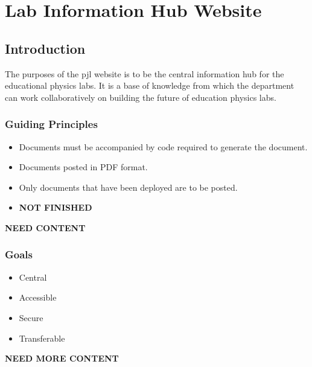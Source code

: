 \documentclass[justified]{pjlProcessDocs}
\begin{document}


\maketitle
\newpage
\tableofcontents
\newpage

\chapter{Lab Information Hub Website}

\section{Introduction}

The purposes of the pjl website is to be the central information hub for the educational physics labs. It is a base of knowledge from which the department can work collaboratively on building the future of education physics labs.

\subsection{Guiding Principles}

\begin{itemize}
\item Documents must be accompanied by code required to generate the document.
\item Documents posted in PDF format.
\item Only documents that have been deployed are to be posted. 
\item {\bf NOT FINISHED}
\end{itemize}

{\bf NEED CONTENT}

\subsection{Goals}

\begin{itemize}
\item Central
\item Accessible
\item Secure
\item Transferable
\end{itemize}
{\bf NEED MORE CONTENT}
\end{document}
